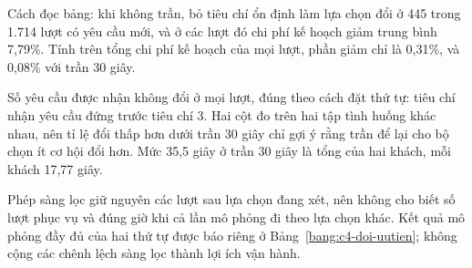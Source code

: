 \begin{table}[htbp]
\centering
\caption[Phép sàng lọc bỏ tiêu chí ổn định của bộ chọn]{Phép sàng lọc bỏ tiêu chí ổn định của bộ chọn trên tập tắc đường cố định (16 kịch bản mỗi cấu hình; bộ chạy
cũ, nên kết quả không suy ra cho tập kiểm tra chính). U: điều phối không trần; C-30: luật C trần 30 giây. Mỗi cột dùng
các lượt quyết định đã ghi của chính cấu hình đó, nên hai cột là hai tập tình huống khác nhau. Chi phí kế hoạch là thời
lượng còn lại của các tuyến dự kiến, không phải chi phí vận hành.}
\label{bang:c4-sangloc}
\small
{}
\end{table}

Cách đọc bảng: khi không trần, bỏ tiêu chí ổn định làm lựa chọn đổi ở 445 trong 1.714 lượt có yêu cầu mới, và ở các
lượt đó chi phí kế hoạch giảm trung bình 7,79\%. Tính trên tổng chi phí kế hoạch của mọi lượt, phần giảm chỉ là
0,31\%, và 0,08\% với trần 30 giây.

Số yêu cầu được nhận không đổi ở mọi lượt, đúng theo cách đặt thứ tự: tiêu chí nhận yêu cầu đứng trước tiêu chí 3. Hai
cột đo trên hai tập tình huống khác nhau, nên tỉ lệ đổi thấp hơn dưới trần 30 giây chỉ gợi ý rằng trần để lại cho bộ chọn
ít cơ hội đổi hơn. Mức 35,5 giây ở trần 30 giây là tổng của hai khách, mỗi khách 17,77 giây.



Phép sàng lọc giữ nguyên các lượt sau lựa chọn đang xét, nên không cho biết số lượt phục vụ và đúng giờ
khi cả lần mô phỏng đi theo lựa chọn khác. Kết quả mô phỏng đầy đủ của hai thứ tự được báo riêng ở
Bảng~\ref{bang:c4-doi-uutien}; không cộng các chênh lệch sàng lọc thành lợi ích vận hành.
